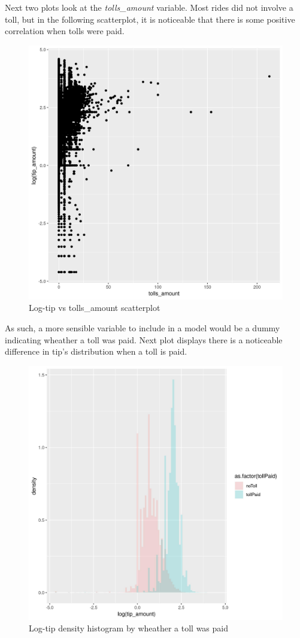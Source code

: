 \documentclass[11pt]{article}
\begin{document}
Next two plots look at the \emph{tolls\_amount} variable. Most rides did not
involve a toll, but in the following scatterplot, it is noticeable
that there is some positive correlation when tolls were paid.
\begin{figure}[htbp]
\centering
\includegraphics[width=.9\linewidth]{./plots/tollsTipPlot.jpg}
\caption{\label{fig:org29ef398}
Log-tip vs tolls\_amount scatterplot}
\end{figure}

As such, a more sensible variable to include in a model would be a dummy
indicating wheather a toll was paid. Next plot displays there is a
noticeable difference in tip's distribution when a toll is paid.
\begin{figure}[htbp]
\centering
\includegraphics[width=.9\linewidth]{./plots/tollsTipDensityHist.jpg}
\caption{\label{fig:org1f3873f}
Log-tip density histogram by wheather a toll was paid}
\end{figure}
\end{document}
